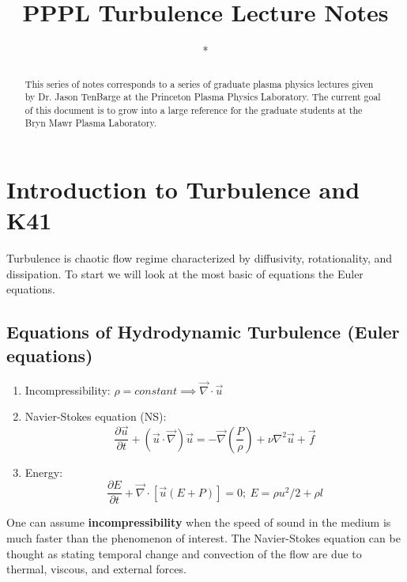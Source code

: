 \documentclass[14pt]{jpp}
\title{PPPL Turbulence Lecture Notes}
\author{*\aff{1}}
\affiliation{\aff{1}Bryn Mawr Plasma Laboratory, Bryn Mawr College,
Bryn Mawr, PA, USA}
\newcommand{\vnab}{\vec{\nabla}}
\newcommand{\delop}{\nabla^{2}}
\newcommand{\vu}{\vec{u}}
\begin{document}
\maketitle

\begin{abstract}
This series of notes corresponds to a series of graduate plasma physics lectures given by Dr. Jason TenBarge at the Princeton Plasma Physics Laboratory. The current goal of this document is to grow into a large reference for the graduate students at the Bryn Mawr Plasma Laboratory.
\end{abstract}
\section{Introduction to Turbulence and K41}
Turbulence is chaotic flow regime characterized by diffusivity, rotationality, and dissipation. To start we will look at the most basic of equations the Euler equations.\\
\subsection{{\bfseries Equations of Hydrodynamic Turbulence} (Euler equations)}
\begin{enumerate}
    \item Incompressibility: $\rho = constant \implies \vnab\cdot\vu$
    \item Navier-Stokes equation (NS): 
    \begin{equation}\label{eqn:NS}
        \frac{\partial{\vu}}{\partial{t}} + (\vu\cdot\vnab)\vu = -\vnab(\frac{P}{\rho}) + \nu\delop\vu  + \vec{f}
    \end{equation}
    
    \item Energy: \[
    \frac{\partial{E}}{\partial{t}} + \vnab\cdot[\vu(E + P)] = 0;\ E = \rho u^2/2+ \rho l
    \]
\end{enumerate}
One can assume {\bfseries incompressibility} when the speed of sound in the medium is much faster than the phenomenon of interest. The Navier-Stokes equation can be thought as stating temporal change and convection of the flow are due to thermal, viscous, and external forces.\\
\end{document}
